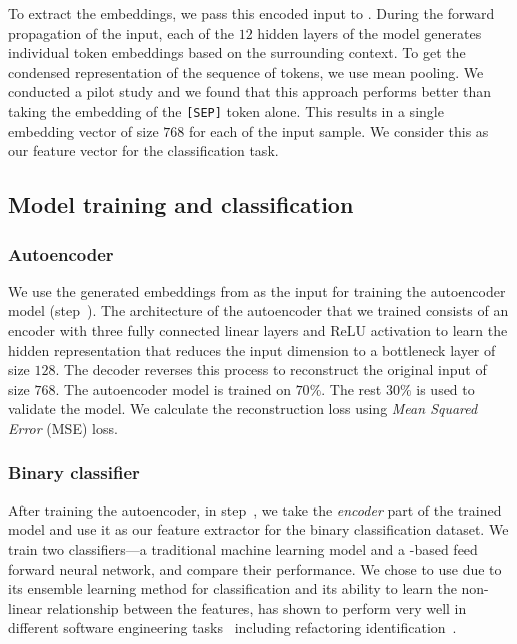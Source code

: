 To extract the embeddings, we pass this encoded input to \GCB{}. 
During the forward propagation of the input, each of the $12$ hidden layers of the model generates individual token embeddings based on the surrounding context. To get the condensed representation of the sequence of tokens, we use mean pooling. We conducted a pilot study and we found that this approach performs better than taking the embedding of the \texttt{[SEP]} token alone.
This results in a single embedding vector of size $768$ for each of the input sample. We consider this as our feature vector for the classification task.


\subsection{Model training and classification}


\subsubsection{Autoencoder}

We use the generated embeddings from \GCB{} as the input for training the autoencoder model (step~). 
The architecture of the autoencoder that we trained consists of an encoder with three fully connected linear layers and ReLU activation to learn the hidden representation that reduces the input dimension to a bottleneck layer of size $128$. The decoder reverses this process to reconstruct the original input of size $768$. The autoencoder model is trained on $70\%$. The rest $30\%$ is used to validate the model. We calculate the reconstruction loss using \textit{Mean Squared Error} (MSE) loss.


\subsubsection{Binary classifier}
After training the autoencoder, in step~, we take the \textit{encoder} part of the trained model and use it as our feature extractor for the binary classification dataset.
We train two classifiers---a traditional machine learning model \rf{} and a \dl{}-based feed forward neural network, and compare their performance. 
We chose to use \rf{}
due to its ensemble learning method for classification and its ability to learn the non-linear relationship between the features,
\rf{} has shown to perform very well in different software engineering tasks~\cite{DiNucci2018, Immaculate2019} including refactoring identification~\cite{Aniche2020Effectiveness,VanDerLeij2021Data}. 

